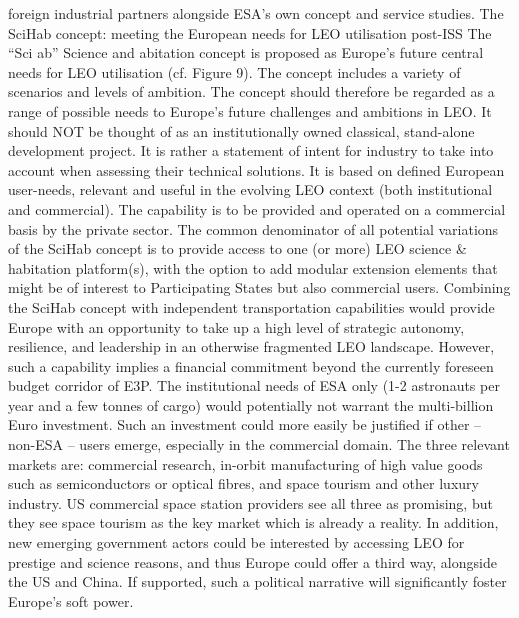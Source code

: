 \documentclass[12pt]{article}
\begin{document}
foreign industrial partners alongside ESA’s own concept and service studies. The SciHab concept: meeting the European needs for LEO utilisation post-ISS The “Sci ab” Science and abitation concept is proposed as Europe’s future central needs for LEO utilisation (cf. Figure 9). The concept includes a variety of scenarios and levels of ambition. The concept should therefore be regarded as a range of possible needs to Europe’s future challenges and ambitions in LEO. It should NOT be thought of as an institutionally owned classical, stand-alone development project. It is rather a statement of intent for industry to take into account when assessing their technical solutions. It is based on defined European user-needs, relevant and useful in the evolving LEO context (both institutional and commercial). The capability is to be provided and operated on a commercial basis by the private sector. The common denominator of all potential variations of the SciHab concept is to provide access to one (or more) LEO science \& habitation platform(s), with the option to add modular extension elements that might be of interest to Participating States but also commercial users. Combining the SciHab concept with independent transportation capabilities would provide Europe with an opportunity to take up a high level of strategic autonomy, resilience, and leadership in an otherwise fragmented LEO landscape. However, such a capability implies a financial commitment beyond the currently foreseen budget corridor of E3P. The institutional needs of ESA only (1-2 astronauts per year and a few tonnes of cargo) would potentially not warrant the multi-billion Euro investment. Such an investment could more easily be justified if other – non-ESA – users emerge, especially in the commercial domain. The three relevant markets are: commercial research, in-orbit manufacturing of high value goods such as semiconductors or optical fibres, and space tourism and other luxury industry. US commercial space station providers see all three as promising, but they see space tourism as the key market which is already a reality. In addition, new emerging government actors could be interested by accessing LEO for prestige and science reasons, and thus Europe could offer a third way, alongside the US and China. If supported, such a political narrative will significantly foster Europe’s soft power.
\end{document}

